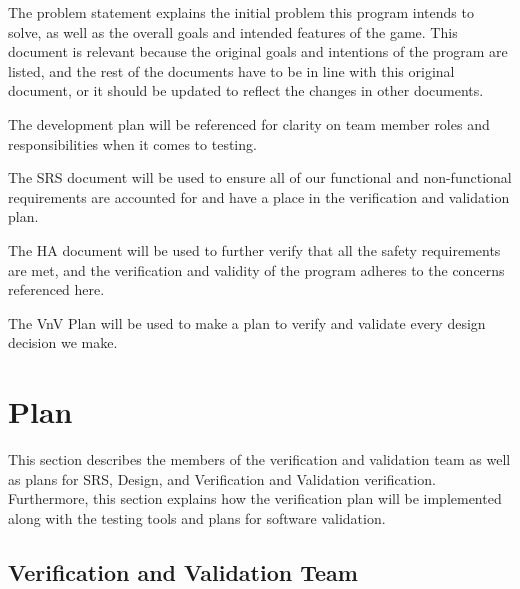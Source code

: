 \documentclass[12pt, titlepage]{article}
\begin{document}
The problem statement explains the initial problem this program intends to solve, as well as the overall goals and intended features of the game. This document is relevant because the original goals and intentions of the program are listed, and the rest of the documents have to be in line with this original document, or it should be updated to reflect the changes in other documents. 

The development plan will be referenced for clarity on team member roles and responsibilities when it comes to testing.

The SRS document will be used to ensure all of our functional and non-functional requirements are accounted for and have a place in the verification and validation plan. 

The HA document will be used to further verify that all the safety requirements are met, and the verification and validity of the program adheres to the concerns referenced here. 

The VnV Plan will be used to make a plan to verify and validate every design decision we make.

\section{Plan}

This section describes the members of the verification and validation team as well as plans for SRS, Design, and Verification and Validation verification. Furthermore, this section explains how the verification plan will be implemented along with the testing tools and plans for software validation.

\subsection{Verification and Validation Team}

\end{document}
